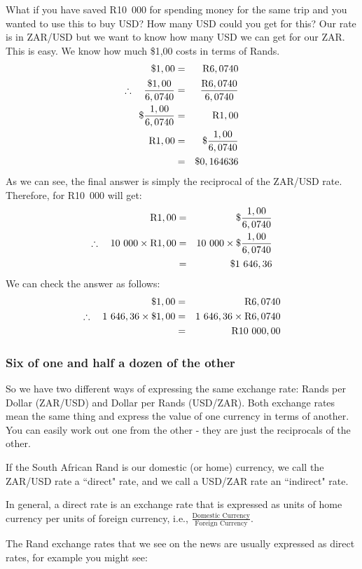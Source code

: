 \documentclass[10pt,a4paper,titlepage,twoside,openright]{report}
\begin{document}
What if you have saved R10~000 for spending money for the same trip and you wanted to use this to buy USD? How many USD could you get for this? Our rate is in ZAR/USD but we want to know how many USD we can get for our ZAR. This is easy. We know how much \$1,00 costs in terms of Rands.
\begin{eqnarray*}
\$ 1,00&=&\rm{R}6,0740\\
\therefore\quad \frac{\$1,00}{6,0740}&=&\frac{\rm{R}6,0740}{6,0740}\\
\$\frac{1,00}{6,0740}&=&\rm{R}1,00\\
\rm{R}1,00&=&\$\frac{1,00}{6,0740}\\
&=&\$0,164636
\end{eqnarray*}
As we can see, the final answer is simply the reciprocal of the ZAR/USD rate. Therefore, for R10~000 will get:
\begin{eqnarray*}
\rm{R} 1,00&=&\$\frac{1,00}{6,0740}\\
\therefore\quad 10~000 \times \rm{R}1,00&=&10~000 \times \$\frac{1,00}{6,0740}\\
&=&\$1~646,36
\end{eqnarray*}
We can check the answer as follows:
\begin{eqnarray*}
\$ 1,00&=&\rm{R}6,0740\\
\therefore\quad 1~646,36 \times \$1,00&=&1~646,36 \times \rm{R}6,0740\\
&=&\rm{R}10~000,00
\end{eqnarray*}

\subsubsection{Six of one and half a dozen of the other}
So we have two different ways of expressing the same exchange rate: Rands per Dollar (ZAR/USD) and Dollar per Rands (USD/ZAR). Both exchange rates mean the same thing and express the value of one currency in terms of another. You can easily work out one from the other - they are just the reciprocals of the other.

If the South African Rand is our domestic (or home) currency, we call the ZAR/USD rate a ``direct" rate, and we call a USD/ZAR rate an ``indirect" rate.

In general, a direct rate is an exchange rate that is expressed as units of home currency per units of foreign currency, i.e., $\frac{\mbox{Domestic Currency}}{\mbox{Foreign Currency}}$.

The Rand exchange rates that we see on the news are usually expressed as direct rates, for example you might see:
\end{document}
